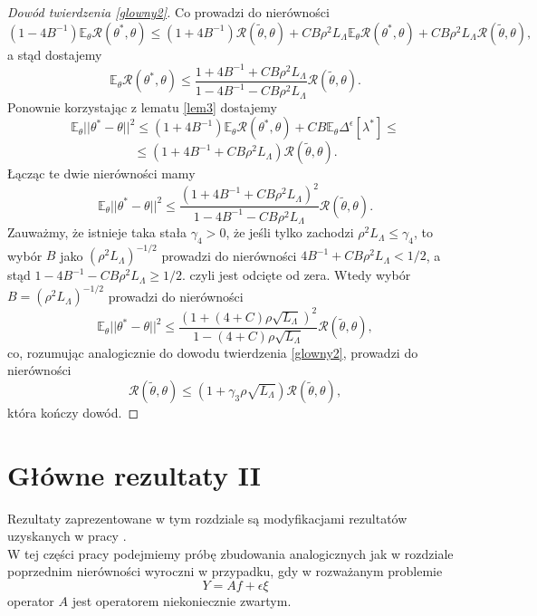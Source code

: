 \documentclass{mwart}
\begin{document}
\begin{proof}[Dowód twierdzenia \ref{glowny2}]
Co prowadzi do nierówności
\begin{displaymath}
(1-4B^{-1})\mathbb{E}_{\theta}\mathcal{R}(\theta^*,\theta)\leq (1+4B^{-1})\mathcal{R}(\tilde{\theta},\theta)+CB\rho^2L_{\Lambda}\mathbb{E}_{\theta}\mathcal{R}(\theta^*,\theta)+CB\rho^2L_{\Lambda}\mathcal{R}(\tilde{\theta},\theta),
\end{displaymath}
a stąd dostajemy
\begin{displaymath}
\mathbb{E}_{\theta}\mathcal{R}(\theta^*,\theta)\leq\frac{1+4B^{-1}+CB\rho^2L_{\Lambda}}{1-4B^{-1}-CB\rho^2L_{\Lambda}}\mathcal{R}(\tilde{\theta},\theta).
\end{displaymath}
Ponownie korzystając z lematu \ref{lem3} dostajemy
\begin{displaymath}
\mathbb{E}_{\theta}||\theta^*-\theta||^2\leq (1+4B^{-1})\mathbb{E}_{\theta}\mathcal{R}(\theta^*,\theta)+CB\mathbb{E}_{\theta}\Delta^{\epsilon}[\lambda^*]\leq
\end{displaymath}
\begin{displaymath}
\leq (1+4B^{-1}+CB\rho^2L_{\Lambda})\mathcal{R}(\tilde{\theta},\theta).
\end{displaymath}
Łącząc te dwie nierówności mamy
\begin{displaymath}
\mathbb{E}_{\theta}||\theta^*-\theta||^2\leq \frac{(1+4B^{-1}+CB\rho^2L_{\Lambda})^2}{1-4B^{-1}-CB\rho^2L_{\Lambda}}\mathcal{R}(\tilde{\theta},\theta).
\end{displaymath}
Zauważmy, że istnieje taka stała $\gamma_4>0$, że jeśli tylko zachodzi $\rho^2L_{\Lambda}\leq \gamma_4$, to wybór $B$ jako $(\rho^2L_{\Lambda})^{-1/2}$ prowadzi do nierówności $4B^{-1}+CB\rho^2L_{\Lambda}<1/2$, a stąd $1-4B^{-1}-CB\rho^2L_{\Lambda}\geq 1/2$. czyli jest odcięte od zera. Wtedy wybór $B=(\rho^2L_{\Lambda})^{-1/2}$ prowadzi do nierówności
\begin{displaymath}
\mathbb{E}_{\theta}||\theta^*-\theta||^2\leq \frac{(1+(4+C)\rho\sqrt{L_{\Lambda}})^2}{1-(4+C)\rho\sqrt{L_{\Lambda}}}\mathcal{R}(\tilde{\theta},\theta),
\end{displaymath}
co, rozumując analogicznie do dowodu twierdzenia \ref{glowny2}, prowadzi do nierówności
\begin{displaymath}
\mathcal{R}(\tilde{\theta},\theta)\leq (1+\gamma_3\rho\sqrt{L_{\Lambda}})\mathcal{R}(\tilde{\theta},\theta),
\end{displaymath}
która kończy dowód.
\end{proof}


\section{Główne rezultaty II}
Rezultaty zaprezentowane w tym rozdziale są modyfikacjami rezultatów uzyskanych w pracy \cite{cavalier2}.\\
W tej części pracy podejmiemy próbę zbudowania analogicznych jak w rozdziale poprzednim nierówności wyroczni w przypadku, gdy w rozważanym problemie
\begin{displaymath}
Y=Af+\epsilon\xi
\end{displaymath}
operator $A$ jest operatorem niekoniecznie zwartym.\\
\end{document}
